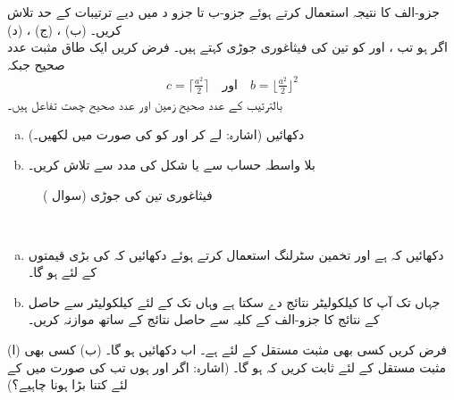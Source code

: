 جزو-الف کا نتیجہ استعمال کرتے ہوئے جزو-ب تا جزو د میں دیے ترتیبات کے حد تلاش کریں۔ (ب) ، (ج) ، (د) 
\\
اگر  ہو تب ،  اور  کو تین کی فیثاغوری جوڑی کہتے ہیں۔ فرض کریں  ایک طاق مثبت عدد صحیح  جبکہ
\begin{align*}
c=\lceil\tfrac{a^2}{2}\rceil\quad \text{اور}\quad b=\lfloor\tfrac{a^2}{2}\rfloor^2
\end{align*}
بالترتیب  کے عدد صحیح زمین اور عدد صحیح چھت تفاعل ہیں۔
\begin{enumerate}[a.]
\item
دکھائیں  (اشارہ:   لے کر  اور  کو  کی صورت میں لکھیں۔)
\item
بلا واسطہ حساب سے یا شکل  کی مدد سے  تلاش کریں۔
\end{enumerate}
\begin{figure}
\centering
{}
\caption{فیثاغوری تین کی جوڑی (سوال )}
\label{شکل_سوال_ترکیب_فیثاغورث_جوڑی}
\end{figure}
\\
\begin{enumerate}[a.]
\item
دکھائیں کہ  ہے اور  تخمین سٹرلنگ استعمال کرتے ہوئے دکھائیں کہ  کی بڑی قیمتوں کے لئے   ہو گا۔
\item
جہاں تک آپ کا کیلکولیٹر نتائج دے سکتا ہے وہاں تک  کے لئے کیلکولیٹر سے حاصل  کے نتائج کا جزو-الف کے کلیہ سے حاصل نتائج کے ساتھ موازنہ کریں۔ 
\end{enumerate}
(ا) فرض کریں کسی بھی مثبت مستقل  کے لئے  ہے۔ اب دکھائیں  ہو گا۔ (ب) کسی بھی مثبت مستقل  کے لئے ثابت کریں کہ  ہو گا۔ (اشارہ: اگر  اور  ہوں تب  کی صورت میں  کے لئے  کتنا بڑا ہونا چاہیے؟)
